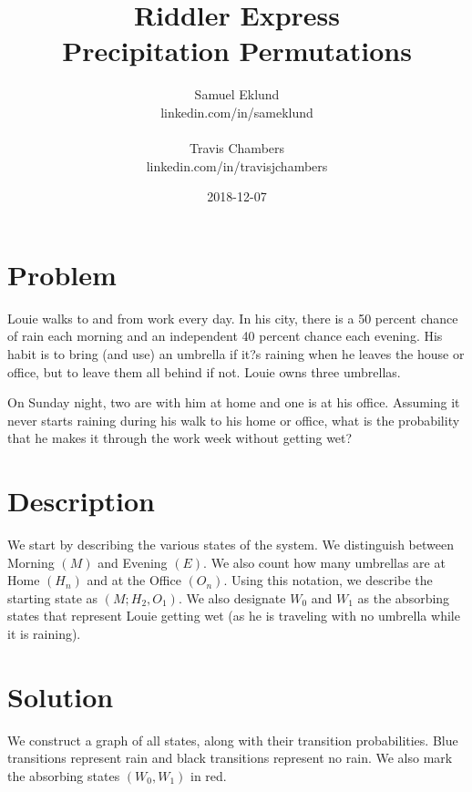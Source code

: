 \documentclass[12pt]{article}
\title{Riddler Express \\ Precipitation Permutations}
\author{Samuel Eklund\\linkedin.com/in/sameklund\\ \\Travis Chambers\\linkedin.com/in/travisjchambers}
\date{2018-12-07}
\begin{document}
\maketitle

\section{Problem}
Louie walks to and from work every day. In his city, there is a 50 percent chance of rain each morning and an independent 40 percent chance each evening. His habit is to bring (and use) an umbrella if it?s raining when he leaves the house or office, but to leave them all behind if not. Louie owns three umbrellas.

On Sunday night, two are with him at home and one is at his office. Assuming it never starts raining during his walk to his home or office, what is the probability that he makes it through the work week without getting wet?

\section{Description}
We start by describing the various states of the system. We  distinguish between Morning $(M)$ and Evening $(E)$. We also count how many umbrellas are at Home $(H_{n})$ and at the Office $(O_{n})$. Using this notation, we describe the starting state as $(M; H_{2}, O_{1})$. We also designate $W_{0}$ and $W_{1}$ as the absorbing states that represent Louie getting wet (as he is traveling with no umbrella while it is raining).

\newpage

\section{Solution}
We construct a graph of all states, along with their transition probabilities. Blue transitions represent rain and black transitions represent no rain. We also mark the absorbing states $(W_{0}, W_{1})$ in red.
\end{document}

